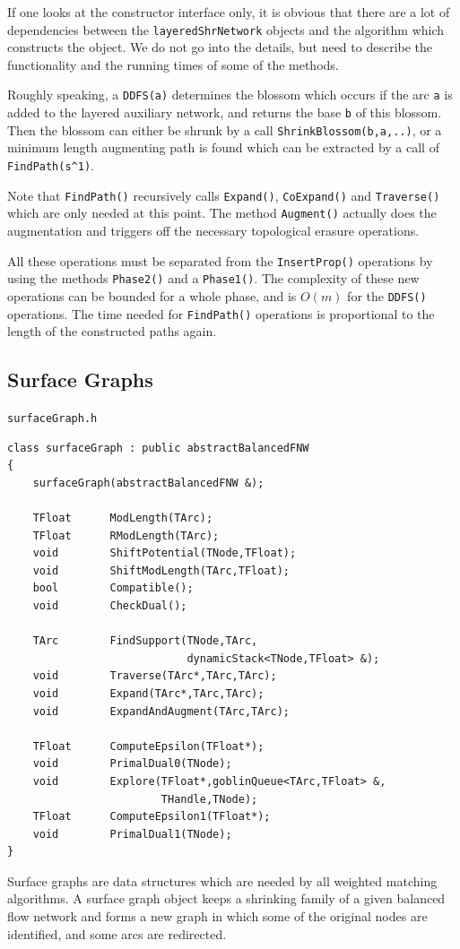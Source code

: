 \documentclass[a4paper,11pt,twoside]{book}
\begin{document}
\begin{multicols}{2}
If one looks at the constructor interface only, it is obvious that there are
a lot of dependencies between the \verb/layeredShrNetwork/ objects and the
algorithm which constructs the object. We do not go into the details, but need
to describe the functionality and the running times of some of the methods.

Roughly speaking, a  \verb/DDFS(a)/ determines the
blossom which occurs if the arc \verb/a/ is added to the layered auxiliary
network, and returns the base \verb/b/ of this blossom. Then the blossom can
either be shrunk by a call \verb/ShrinkBlossom(b,a,..)/, or a minimum length
augmenting path is found which can be extracted by a call of
\verb/FindPath(s^1)/.

Note that \verb/FindPath()/ recursively calls \verb/Expand()/, \verb/CoExpand()/
and \verb/Traverse()/ which are only needed at this point. The method
\verb/Augment()/ actually does the augmentation and triggers off the necessary
topological erasure operations.

All these operations must be separated from the \verb/InsertProp()/ operations
by using the methods \verb/Phase2()/ and a \verb/Phase1()/.
The complexity of these new operations can be bounded for
a whole phase, and is $O(m)$ for the \verb/DDFS()/ operations. The time needed
for \verb/FindPath()/ operations is proportional to the length of the constructed
paths again.



\subsection{Surface Graphs}
\label{slb235}
\myinclude\verb/surfaceGraph.h/
\begin{mymethods}
\begin{verbatim}
class surfaceGraph : public abstractBalancedFNW
{
    surfaceGraph(abstractBalancedFNW &);

    TFloat      ModLength(TArc);
    TFloat      RModLength(TArc);
    void        ShiftPotential(TNode,TFloat);
    void        ShiftModLength(TArc,TFloat);
    bool        Compatible();
    void        CheckDual();

    TArc        FindSupport(TNode,TArc,
                            dynamicStack<TNode,TFloat> &);
    void        Traverse(TArc*,TArc,TArc);
    void        Expand(TArc*,TArc,TArc);
    void        ExpandAndAugment(TArc,TArc);

    TFloat      ComputeEpsilon(TFloat*);
    void        PrimalDual0(TNode);
    void        Explore(TFloat*,goblinQueue<TArc,TFloat> &,
                        THandle,TNode);
    TFloat      ComputeEpsilon1(TFloat*);
    void        PrimalDual1(TNode);
}
\end{verbatim}
\end{mymethods}
Surface graphs are data structures which are needed by all weighted matching
algorithms. A surface graph object keeps a
shrinking family of a given balanced flow network and forms a new graph in
which some of the original nodes are identified, and some arcs are redirected.


\end{multicols}
\end{document}

